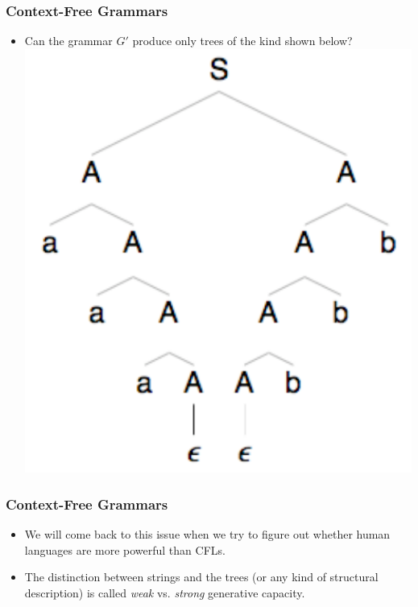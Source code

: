 \begin{frame}
\frametitle{Context-Free Grammars}
\begin{itemize}
\item Can the grammar $G'$ produce only trees of the kind shown below? \\
\includegraphics[scale=0.5]{figures/cfg1}
\end{itemize}

\end{frame}

\begin{frame}
\frametitle{Context-Free Grammars}
\begin{itemize}
\item We will come back to this issue when we try to figure out whether human languages are more powerful than CFLs. 
\item The distinction between strings and the trees (or any kind of structural description) is called {\em weak} vs. {\em strong} generative capacity.
\end{itemize}

\end{frame}

